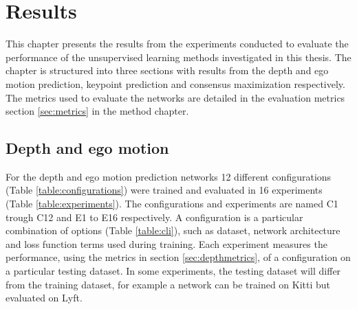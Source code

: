 \chapter{Results}\label{cha:results}

This chapter presents the results from the experiments conducted to evaluate the performance of the unsupervised learning methods investigated in this thesis. The chapter is structured into three sections with results from the depth and ego motion prediction, keypoint prediction and consensus maximization respectively. The metrics used to evaluate the networks are detailed in the evaluation metrics section \ref{sec:metrics} in the method chapter.

\section{Depth and ego motion}

For the depth and ego motion prediction networks 12 different configurations (Table \ref{table:configurations}) were trained and evaluated in 16 experiments (Table \ref{table:experiments}). The configurations and experiments are named C1 trough C12 and E1 to E16 respectively. A configuration is a particular combination of options (Table \ref{table:cli}), such as dataset, network architecture and loss function terms used during training. Each experiment measures the performance, using the metrics in section \ref{sec:depthmetrics}, of a configuration on a particular testing dataset. In some experiments, the testing dataset will differ from the training dataset, for example a network can be trained on Kitti but evaluated on Lyft.

